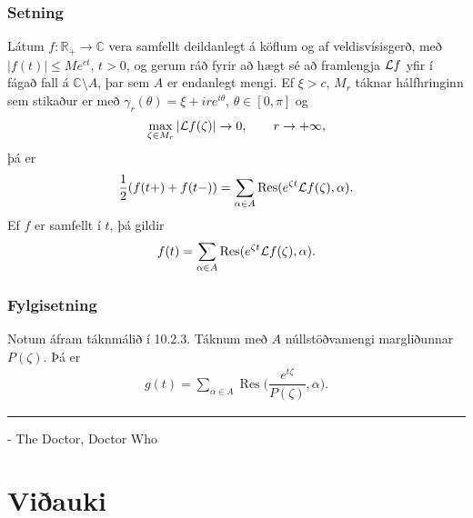 \documentclass[a4paper,10pt,icelandic]{sphinxmanual}
\begin{document}
\subsection{Setning}
\label{\detokenize{Kafli10:id4}}
Látum \(f:\mathbb{R}_+\to {\mathbb{C}}\) vera samfellt deildanlegt á köflum og af veldisvísisgerð, með \(|f(t)|\leq Me^{ct}\), \(t>0\), og gerum ráð fyrir að hægt sé að framlengja \({\cal L} f\) yfir í fágað fall á \({\mathbb{C}}\setminus A\), þar sem \(A\) er endanlegt mengi. Ef \(\xi>c\), \(M_r\) táknar hálfhringinn sem stikaður er með \(\gamma_r(\theta)=\xi+ire^{i\theta}\), \(\theta\in [0,\pi]\) og
\begin{equation*}
\begin{split}\max_{\zeta\in M_r}|{\cal L} f(\zeta)|\to 0, \qquad r\to +\infty,\end{split}
\end{equation*}
þá er
\begin{equation*}
\begin{split}\frac 12(f(t+)+f(t-))=
\sum_{\alpha\in A}\operatorname{Res}(e^{\zeta t}{\cal L} f(\zeta),\alpha).\end{split}
\end{equation*}
Ef \(f\) er samfellt í \(t\), þá gildir
\begin{equation*}
\begin{split}f(t)= \sum_{\alpha\in A}\operatorname{Res}(e^{\zeta t}{\cal L} f(\zeta),\alpha).\end{split}
\end{equation*}

\subsection{Fylgisetning}
\label{\detokenize{Kafli10:fylgisetning}}
Notum áfram táknmálið í 10.2.3. Táknum með \(A\) núllstöðvamengi margliðunnar \(P(\zeta)\). Þá er
\begin{equation*}
\begin{split}g(t)= \sum\limits_{\alpha\in A}
\operatorname{Res}\bigg( \dfrac {e^{t\zeta}}{P(\zeta)},\alpha\bigg).\end{split}
\end{equation*}

\bigskip\hrule\bigskip



- The Doctor, Doctor Who


\chapter{Viðauki}
\label{\detokenize{vidauki:viauki}}\label{\detokenize{vidauki::doc}}
\end{document}
